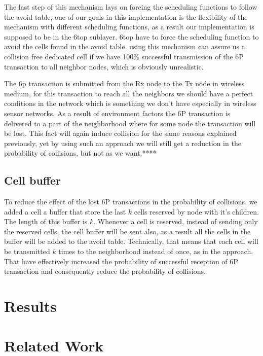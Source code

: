 \documentclass[10pt, conference, compsocconf]{IEEEtran}
\begin{document}
The last step of this mechanism lays on forcing the scheduling functions to follow the avoid table, one of our goals in this implementation is the flexibility of the mechanism with different  scheduling functions, as a result our implementation is supposed to be in the 6top sublayer. 6top have to force the scheduling function to avoid the cells found in the avoid table. using this mechanism can assure us a collision free dedicated cell if we have 100\% successful transmission of the 6P transaction to all neighbor nodes, which is obviously unrealistic.

The 6p transaction is submitted from the Rx node to the Tx node in wireless medium, for this transaction to reach all the neighbors we should have a perfect conditions in the network which is something we don't have especially in wireless sensor networks. As a result of environment factors the 6P transaction is delivered to a part of the neighborhood where for some node the transaction will be lost. This fact will again induce collision for the same reasons explained previously, yet by using such an approach we will still get a reduction in the probability of collisions, but not as we want.**** 

\subsection{Cell buffer}

To reduce the effect of the lost 6P transactions in the probability of collisions, we added a cell a buffer that store the last $k$ cells reserved by node with it's children. The length of this buffer is $k$.  Whenever a cell is reserved, instead of sending only the reserved cells, the cell buffer will be sent also, as a result all the cells in the buffer will be added to the avoid table. Technically, that means that each cell will be transmitted $k$ times to the neighborhood instead of once, as in the  approach. That have effectively increased the probability of successful reception of 6P transaction and consequently reduce the probability of collisions. 

     


 	
\section{Results}

\section{Related Work}
\end{document}
